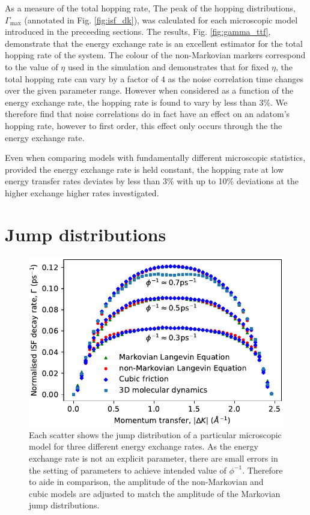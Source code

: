 \documentclass[7pt]{article}
\begin{document}
As a measure of the total hopping rate, The peak of the hopping distributions, $\Gamma_{\text{max}}$ (annotated in Fig. \ref{fig:isf_dk}), was calculated for each microscopic model introduced in the preceeding sections. The results, Fig. \ref{fig:gamma_ttf}, demonstrate that the energy exchange rate is an excellent estimator for the total hopping rate of the system. The colour of the non-Markovian markers correspond to the value of $\eta$ used in the simulation and demonstrates that for fixed $\eta$, the total hopping rate can vary by a factor of $4$ as the noise correlation time changes over the given parameter range. However when considered as a function of the energy exchange rate, the hopping rate is found to vary by less than $3$\%. We therefore find that noise correlations do in fact have an effect on an adatom's hopping rate, however to first order, this effect only occurs through the the energy exchange rate.

Even when comparing models with fundamentally different microscopic statistics, provided the energy exchange rate is held constant, the hopping rate at low energy transfer rates deviates by less than 3\% with up to 10\% deviations at the higher exchange higher rates investigated.  

\section{Jump distributions}

\begin{figure}
	\centering
	\includegraphics[width=1.0\columnwidth]{jump_distribution}
	\caption{Each scatter shows the jump distribution of a particular microscopic model for three different energy exchange rates. As the energy exchange rate is not an explicit parameter, there are small errors in the setting of parameters to achieve intended value of $\phi^{-1}$. Therefore to aide in comparison, the amplitude of the non-Markovian and cubic models are adjusted to match the amplitude of the Markovian jump distributions.}
	\label{fig:jump_distribution}
\end{figure}
\end{document}
